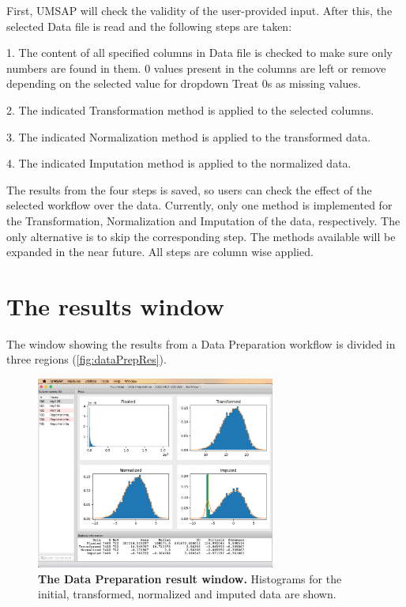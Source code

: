 First, UMSAP will check the validity of the user-provided input. After this, the
selected Data file is read and the following steps are taken:

\num{1}. The content of all specified columns in Data file is checked to make sure
only numbers are found in them. \num{0} values present in the columns are left or
remove depending on the selected value for dropdown Treat \num{0}s as missing values.

\num{2}. The indicated Transformation method is applied to the selected columns.

\num{3}. The indicated Normalization method is applied to the transformed data.

\num{4}. The indicated Imputation method is applied to the normalized data.

The results from the four steps is saved, so users can check the effect of the selected
workflow over the data. Currently, only one method is implemented for the Transformation,
Normalization and Imputation of the data, respectively. The only alternative is to skip
the corresponding step. The methods available will be expanded in the near future.
All steps are column wise applied.

\section{The results window}

The window showing the results from a Data Preparation workflow is divided in three
regions (\autoref{fig:dataPrepRes}).

\begin{figure}[h]
    \centering
    \includegraphics[width=0.7\textwidth]{./IMAGES/DATAPREP/DataPrepRes.jpg}
    \caption[The Data Preparation result window]{\textbf{The Data Preparation
    result window.} Histograms for the initial, transformed, normalized and
    imputed data are shown. }
    \label{fig:dataPrepRes}
    \vspace{-5pt} 	
\end{figure} 

